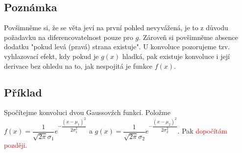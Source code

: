 \subsection{Pozn\'amka}
Pov\v simn\v eme si, \v ze se v\v eta jev\' i na prvn\' i pohled nevyv\'a\v zen\'a, je to z d\r uvodu po\v zadavku na diferencovatelnost pouze pro $g$. Z\'arove\v n si pov\v simn\v eme absence dodatku "pokud lev\'a (prav\'a) strana existuje". U konvoluce pozorujeme tzv. vyhlazovac\'i efekt, kdy pokud je $g(x)$ hladk\'a, pak existuje konvoluce i jej\'i derivace bez ohledu na to, jak nespojit\'a je funkce $f(x)$.

\subsection{P\v r\'iklad}
Spo\v c\'itejme konvoluci dvou Gaussov\'zch funkc\'i. Polo\v zme $f(x)= \dfrac{1}{\sqrt{2\pi}\sigma_1}e^{-\dfrac{(x-\mu_1)^2}{2\sigma_1^2}}$ a $g(x)= \dfrac{1}{\sqrt{2\pi}\sigma_2}e^{-\dfrac{(x-\mu_2)^2}{2\sigma_2^2}}$.
Pak \textcolor{red}{ dopo\v c\'it\'am pozd\v eji.}

 
















